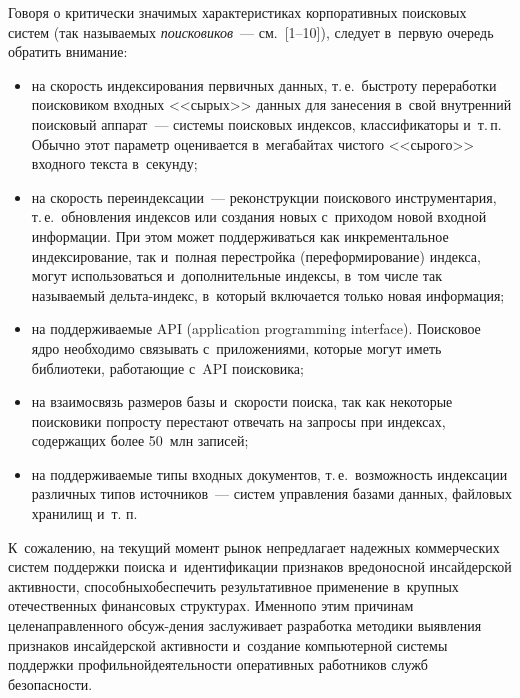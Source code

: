 \begin{multicols}{2}
  Говоря о критически значимых характеристиках корпоративных поисковых 
систем (так называемых \textit{поисковиков}~--- см.~[1--10]), следует в~первую 
очередь обратить внимание:
  \begin{itemize}
\item на скорость индексирования первичных данных, т.\,е.\ быстроту 
переработки поисковиком входных <<сырых>> данных для занесения в~свой 
внутренний поисковый аппарат~--- системы поисковых индексов, 
классификаторы и~т.\,п. Обычно этот параметр оценивается в~мегабайтах 
чистого <<сырого>> входного текста в~секунду;
\item на скорость переиндексации~--- реконструкции поискового 
инструментария, т.\,е.\ обновления индексов или создания новых с~приходом 
новой входной информации. При этом может поддерживаться как 
инкрементальное индексирование, так и~полная перестройка 
(переформирование) индекса, могут использоваться и~дополнительные 
индексы, в~том числе так называемый дель\-та-ин\-декс, в~который 
включается только новая информация;
\item на поддерживаемые API (application programming interface). Поисковое ядро необходимо связывать 
с~приложениями, которые могут иметь библиотеки, работающие с~API 
поисковика;
\item на взаимосвязь размеров базы и~скорости поиска, так как некоторые 
поисковики попросту перестают отвечать на запросы при индексах, 
содержащих более 50~млн записей;
\item на поддерживаемые типы входных документов, т.\,е.\ возможность 
индексации различных типов источников~--- сис\-тем управ\-ле\-ния базами данных, файловых хранилищ 
и~т. п. 
\end{itemize}

  К~сожалению, на текущий момент рынок не\linebreak предлагает надежных 
коммерческих систем поддержки поиска и~идентификации признаков 
вредоносной инсайдерской активности, способных\linebreak обеспечить результативное 
применение в~крупных отечественных финансовых структурах. Именно\linebreak по 
этим причинам це\-ле\-на\-прав\-лен\-но\-го обсуж-\linebreak дения заслуживает разработка 
методики вы\-яв\-ле\-ния признаков инсайдерской актив\-ности и~со\-зда\-ние 
компьютерной сис\-те\-мы поддержки профильной\linebreak дея\-тель\-ности оперативных 
работников служб безопас\-ности.
  

\end{multicols}

